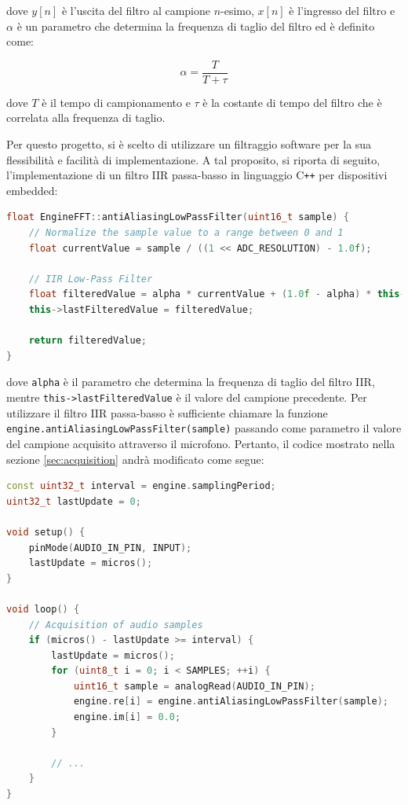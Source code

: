 \documentclass[a4paper,12pt]{report}  %
\newcommand{\lstinlinebg}[1]{\colorbox{backcolour}{\lstinline|#1|}}
\begin{document}
dove $y[n]$ è l'uscita del filtro al campione $n$-esimo, $x[n]$ è l'ingresso del filtro e $\alpha$ è un parametro che determina la frequenza di taglio del filtro ed è definito come:

\begin{equation}
    \alpha = \frac{T}{T + \tau} \nonumber
\end{equation}

dove $T$ è il tempo di campionamento e $\tau$ è la costante di tempo del filtro che è correlata alla frequenza di taglio.

Per questo progetto, si è scelto di utilizzare un filtraggio software per la sua flessibilità e facilità di implementazione.
A tal proposito, si riporta di seguito, l'implementazione di un filtro IIR passa-basso in linguaggio C\texttt{++} per dispositivi embedded:

\begin{lstlisting}[language=C++,keywords={const, uint8_t, float, this, return, uint16_t, analogRead, println, delay}]
float EngineFFT::antiAliasingLowPassFilter(uint16_t sample) {
    // Normalize the sample value to a range between 0 and 1
    float currentValue = sample / ((1 << ADC_RESOLUTION) - 1.0f);
    
    // IIR Low-Pass Filter
    float filteredValue = alpha * currentValue + (1.0f - alpha) * this->lastFilteredValue;
    this->lastFilteredValue = filteredValue;
    
    return filteredValue;
}
\end{lstlisting}

dove \lstinlinebg{alpha} è il parametro che determina la frequenza di taglio del filtro IIR, mentre \lstinlinebg{this->lastFilteredValue} è il valore del campione precedente.
Per utilizzare il filtro IIR passa-basso è sufficiente chiamare la funzione \lstinlinebg{engine.antiAliasingLowPassFilter(sample)} passando come parametro il valore del campione acquisito attraverso il microfono.
Pertanto, il codice mostrato nella sezione \ref{sec:acquisition} andrà modificato come segue:

\begin{lstlisting}[language=C++,keywords={antiAliasingLowPassFilter, const, uint8_t, if, for, void, Serial, begin, uint16_t, analogRead, println, uint32_t, micros, pinMode, INPUT}]
const uint32_t interval = engine.samplingPeriod;
uint32_t lastUpdate = 0;

void setup() {
    pinMode(AUDIO_IN_PIN, INPUT);
    lastUpdate = micros();
}

void loop() {
    // Acquisition of audio samples
    if (micros() - lastUpdate >= interval) {
        lastUpdate = micros();
        for (uint8_t i = 0; i < SAMPLES; ++i) {
            uint16_t sample = analogRead(AUDIO_IN_PIN);
            engine.re[i] = engine.antiAliasingLowPassFilter(sample);
            engine.im[i] = 0.0;
        }
     
        // ...
    }
}
\end{lstlisting}
\end{document}
